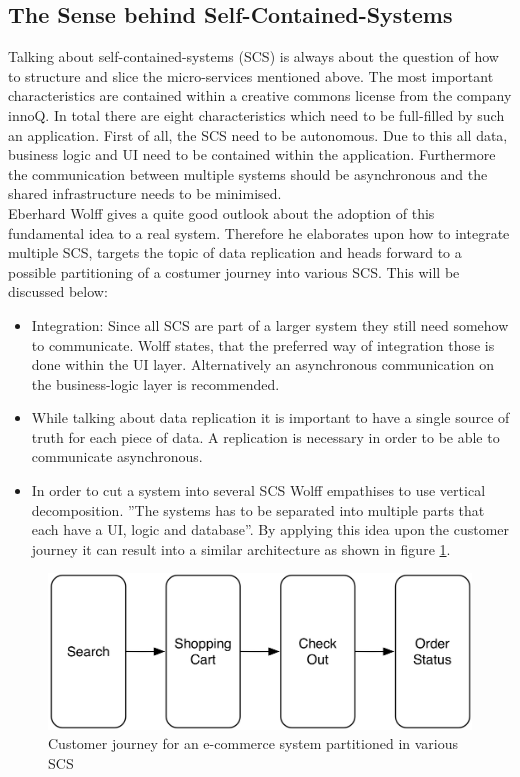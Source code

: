 \subsection{The Sense behind Self-Contained-Systems}
Talking about self-contained-systems (SCS) is always about the question of how to structure and slice the micro-services mentioned above.\newline
The most important characteristics are contained within a creative commons license from the company innoQ. In total there are eight characteristics which need to be full-filled by such an application. First of all, the SCS need to be autonomous. Due to this all data, business logic and UI need to be contained within the application. Furthermore the communication between multiple systems should be asynchronous and the shared infrastructure needs to be minimised. \cite{scs}\newline
\\
Eberhard Wolff gives a quite good outlook about the adoption of this fundamental idea to a real system. Therefore he elaborates upon how to integrate multiple SCS, targets the topic of data replication and heads forward to a possible partitioning of a costumer journey into various SCS. This will be discussed below:\newline
\begin{itemize}
    \item Integration: Since all SCS are part of a larger system they still need somehow to communicate. Wolff states, that the preferred way of integration those is done within the UI layer. Alternatively an asynchronous communication on the business-logic layer is recommended.
    \item While talking about data replication it is important to have a single source of truth for each piece of data. A replication is necessary in order to be able to communicate asynchronous.
    \item In order to cut a system into several SCS Wolff empathises to use vertical decomposition. ''The systems has to be separated into multiple parts that each have a UI, logic and database''\cite{scsWolf}. By applying this idea upon the customer journey it can result into a similar architecture as shown in figure \ref{fig:scsJourney}.
\end{itemize}
\cite{scsWolf}\newline
\begin{figure}[!htb]
    \centering
    \includegraphics[scale=0.2]{pictures/Journey.png}
    \caption{Customer journey for an e-commerce system partitioned in various SCS \cite{scsWolf}}
    \label{fig:scsJourney}
\end{figure}

